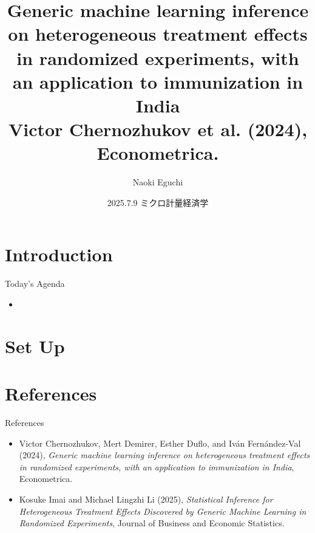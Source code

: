 \documentclass[xcolor=svgnames,aspectratio=169]{beamer}
\begin{document}
 

\title{Generic machine learning inference on heterogeneous treatment effects in randomized experiments, with an application to immunization in India \\ \small{Victor Chernozhukov et al. (2024), Econometrica.}}
\author{Naoki Eguchi}          
\date{2025.7.9 ミクロ計量経済学}

\begin{frame}                  
    \titlepage                     
\end{frame}

\section{Introduction}

\begin{frame}{Today's Agenda}
    \begin{itemize}
        \item 
    \end{itemize}
\end{frame}

\section{Set Up}

\section{References}

\begin{frame}{References}
    \begin{itemize}
        \item Victor Chernozhukov, Mert Demirer, Esther Duflo, and Iván Fernández-Val (2024), \textit{Generic machine learning inference on heterogeneous treatment effects in randomized experiments, with an application to immunization in India}, Econometrica.
        \item Kosuke Imai and Michael Lingzhi Li (2025), \textit{Statistical Inference for Heterogeneous Treatment Effects Discovered by Generic Machine Learning in Randomized Experiments}, Journal of Business and Economic Statistics.
    \end{itemize}
\end{frame}
\end{document}
